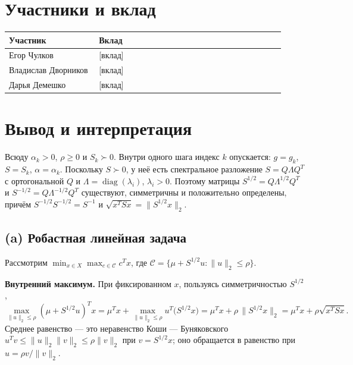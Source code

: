 \documentclass[11pt,a4paper]{article}
\newcommand{\norm}[1]{\lVert #1\rVert_2}
\DeclareMathOperator{\diag}{diag}
\begin{document}
\section*{Участники и вклад}
\begin{center}
\begin{tabular}{@{}p{0.3\linewidth}p{0.62\linewidth}@{}}
\toprule
Участник & Вклад \\
\midrule
Егор Чулков & [вклад] \\
Владислав Дворников & [вклад] \\
Дарья Демешко & [вклад] \\
\bottomrule
\end{tabular}
\end{center}

\newpage
\tableofcontents
\newpage


\section{Вывод и интерпретация}\label{sec:derivation}

Всюду $\alpha_k>0$, $\rho\ge0$ и $S_k\succ0$. Внутри одного шага индекс $k$ опускается:
$g=g_k$, $S=S_k$, $\alpha=\alpha_k$. Поскольку $S\succ0$, у неё есть спектральное разложение
$S=Q\Lambda Q^T$ с ортогональной $Q$ и $\Lambda=\diag(\lambda_i)$, $\lambda_i>0$. Поэтому матрицы
$S^{1/2}=Q\Lambda^{1/2}Q^T$ и $S^{-1/2}=Q\Lambda^{-1/2}Q^T$ существуют, симметричны и
положительно определены, причём $S^{-1/2}S^{-1/2}=S^{-1}$ и $\sqrt{x^TSx}=\norm{S^{1/2}x}$.

\subsection{(a) Робастная линейная задача}

Рассмотрим $\min_{x\in X}\max_{c\in\mathcal C}c^Tx$, где
$\mathcal C=\{\mu+S^{1/2}u:\norm u\le\rho\}$.

\textbf{Внутренний максимум.} При фиксированном $x$, пользуясь симметричностью $S^{1/2}$,
\begin{equation*}
\max_{\norm u\le\rho}(\mu+S^{1/2}u)^Tx=\mu^Tx+\max_{\norm u\le\rho}u^T\big(S^{1/2}x\big)
=\mu^Tx+\rho\,\norm{S^{1/2}x}=\mu^Tx+\rho\sqrt{x^TSx}.
\end{equation*}
Среднее равенство — это неравенство Коши — Буняковского $u^Tv\le\norm u\norm v\le\rho\norm v$
при $v=S^{1/2}x$; оно обращается в равенство при $u=\rho v/\norm v$.
\end{document}

